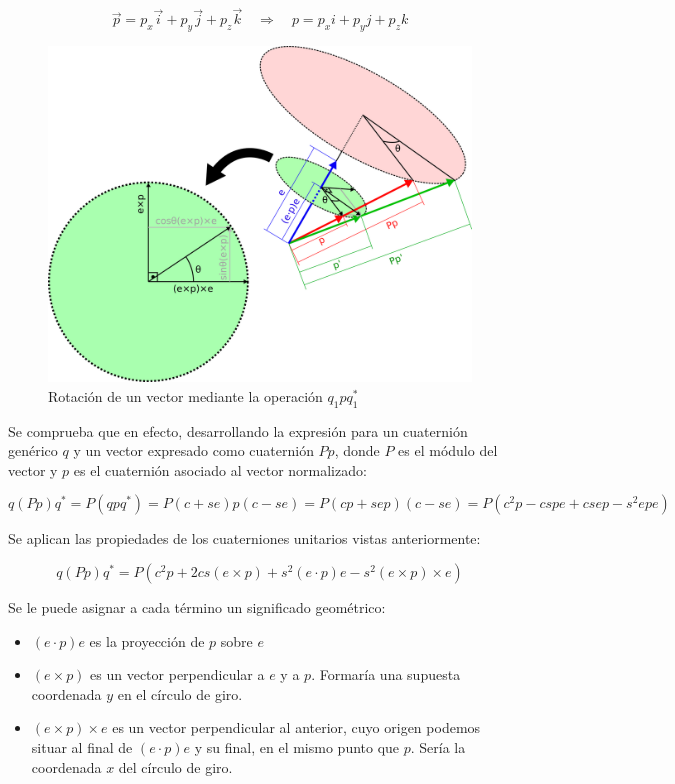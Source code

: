 \documentclass[10pt, a4paper]{report}
\begin{document}
\begin{equation}
\vec{p} = p_x\vec{i} + p_y\vec{j} + p_z\vec{k} \quad \Rightarrow \quad p = p_xi + p_yj + p_zk
\end{equation}

\begin{figure}[h] 
	\centering
		\includegraphics[scale=1.1]{../img/rotation_quaternion.png} 
	\caption{Rotación de un vector mediante la operación $q_1pq_1^*$}
	\label{fig: rot_cuat}
\end{figure}

Se comprueba que en efecto, desarrollando la expresión para un cuaternión genérico $q$ y un vector expresado como cuaternión $Pp$, donde $P$ es el módulo del vector y $p$ es el cuaternión asociado al vector normalizado:

$$ q(Pp)q^* = P(qpq^*) = P(c+se)p(c-se) = P(cp + sep)(c - se) = P(c^2p - cspe + csep - s^2epe) $$

Se aplican las propiedades de los cuaterniones unitarios vistas anteriormente:

\begin{equation} \label{eq: E12} 
q(Pp)q^* = P(c^2p + 2cs(e \times p) + s^2(e \cdot p)e - s^2(e \times p) \times e) 
\end{equation}

Se le puede asignar a cada término un significado geométrico:

\begin{itemize}

\item $(e \cdot p)e$ es la proyección de $p$ sobre $e$
\item $(e \times p)$ es un vector perpendicular a $e$ y a $p$. Formaría una supuesta coordenada $y$ en el círculo de giro.
\item $(e \times p) \times e$ es un vector perpendicular al anterior, cuyo origen podemos situar al final de $(e \cdot p)e$ y su final, en el mismo punto que $p$. Sería la coordenada $x$ del círculo de giro.

\end{itemize}  
\end{document}
